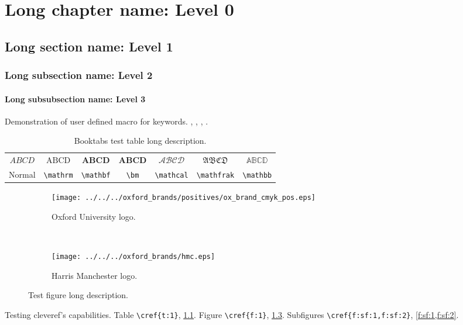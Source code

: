 \chapter[Short chapter name]{Long chapter name: Level 0}
	\section[Short section name]{Long section name: Level 1}
		\subsection[Short subsection name]{Long subsection name: Level 2}
			\subsubsection[Short subsubsection name]{Long subsubsection name: Level 3}
				Demonstration of user defined macro for keywords. , , , \cite{greenwade93}.
				
				\begin{table}[htbp!]
					\centering
					\caption[Test table short description.]{Booktabs test table long description.}
					\label{t:1}
					\begin{tabular}{ccccccc}
						\toprule
						$ ABCD $ & $ \mathrm{ABCD} $ & $ \mathbf{ABCD} $ & $ \bm{ABCD} $ & $ \mathcal{ABCD} $ & $ \mathfrak{ABCD} $ & $ \mathbb{ABCD} $\\
						\cmidrule{2-3}\morecmidrules\cmidrule{5-6}
						Normal & \verb|\mathrm| &\verb|\mathbf| & \verb|\bm| & \verb|\mathcal| & \verb|\mathfrak| & \verb|\mathbb| \\
						\bottomrule
					\end{tabular}
				\end{table}
				
				\begin{figure}[htbp!]
					\centering
					\begin{subfigure}[c]{0.45\textwidth}
						\centering
						\texttt{[image: ../../../oxford\_brands/positives/ox\_brand\_cmyk\_pos.eps]}
						\caption{Oxford University logo.}
						\label{f:sf:1}
					\end{subfigure}
					~
					\begin{subfigure}[c]{0.45\textwidth}
						\centering
						\texttt{[image: ../../../oxford\_brands/hmc.eps]}
						\caption{Harris Manchester logo.}
						\label{f:sf:2}
					\end{subfigure}
					\caption[Test figure short description.]{Test figure long description.}
					\label{f:1}
				\end{figure}
				
				Testing cleveref's capabilities. Table \verb|\cref{t:1}|, \cref{t:1}. Figure \verb|\cref{f:1}|, \cref{f:1}. Subfigures \verb|\cref{f:sf:1,f:sf:2}|, \cref{f:sf:1,f:sf:2}.
\savearabiccounter